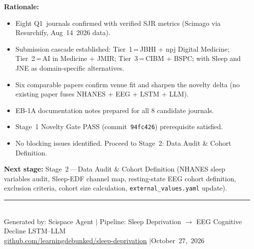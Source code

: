 \documentclass[a4paper,11pt]{article}
\begin{document}
\medskip
\textbf{Rationale:}
\begin{itemize}\setlength{\itemsep}{3pt}
  \item Eight Q1~journals confirmed with verified SJR metrics
        (Scimago via Resurchify, Aug~14~2026 data).
  \item Submission cascade established: Tier~1\,=\,JBHI + npj Digital Medicine;
        Tier~2\,=\,AI in Medicine + JMIR;
        Tier~3\,=\,CIBM + BSPC; with Sleep and JNE as domain-specific alternatives.
  \item Six comparable papers confirm venue fit and sharpen the novelty delta
        (no existing paper fuses NHANES + EEG + LSTM + LLM).
  \item EB-1A documentation notes prepared for all 8 candidate journals.
  \item Stage~1 Novelty Gate PASS (commit~\texttt{94fc426}) prerequisite satisfied.
  \item No blocking issues identified. Proceed to Stage~2: Data Audit \& Cohort
        Definition.
\end{itemize}

\medskip
\textbf{Next stage:} Stage~2\,---\,Data Audit \& Cohort Definition (NHANES sleep
variables audit, Sleep-EDF channel map, resting-state EEG cohort definition,
exclusion criteria, cohort size calculation, \texttt{external\_values.yaml} update).

\vspace{1.2em}
\begin{center}
  \textcolor{navyblue}{\rule{0.45\linewidth}{0.5pt}}\\[0.35em]
  {\small Generated by: Scispace Agent \quad$|$\quad
    Pipeline: Sleep Deprivation $\rightarrow$ EEG Cognitive Decline LSTM--LLM}\\[0.1em]
  {\small
    \href{https://github.com/learningdebunked/sleep-deprivation}%
         {github.com/learningdebunked/sleep-deprivation}
    \quad$|$\quad October~27,~2026}
\end{center}
\end{document}
